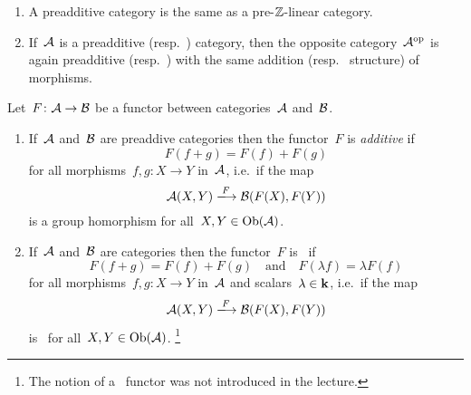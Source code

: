 \begin{remark*}
  \leavevmode
  \begin{enumerate}
    \item
      A preadditive category is the same as a pre\nobreakdash-$\mathbb{Z}$\nobreakdash-linear category.
    \item
      If~$\mathcal{A}$ is a preadditive (resp.\ {\preklin}) category, then the opposite category~$\mathcal{A}^{\mathrm{op}}$ is again preadditive (resp.\ {\preklin}) with the same addition (resp.~{\module{$\kf$}} structure) of morphisms.
  \end{enumerate}
\end{remark*}


\begin{definition}
  Let~$F \colon \mathcal{A} \to \mathcal{B}$ be a functor between categories~$\mathcal{A}$ and~$\mathcal{B}$.
  \begin{enumerate}
    \item
      If~$\mathcal{A}$ and~$\mathcal{B}$ are preaddive categories then the functor~$F$ is \emph{additive} if
      \[
          F(f + g)
        = F(f) + F(g)
      \]
      for all morphisms~$f, g \colon X \to Y$ in~$\mathcal{A}$, i.e.\ if the map
      \[
                    \Acat(X, Y)
        \xlongto{F} \Bcat(F(X), F(Y))
      \]
      is a group homorphism for all~$X, Y \in \operatorname{Ob}(\mathcal{A})$.
    \item
      If~$\mathcal{A}$ and~$\mathcal{B}$ are {\preklin} categories then the functor~$F$ is~\emph{{\klin}} if
      \[
        F(f + g) = F(f) + F(g)
        \quad\text{and}\quad
        F(\lambda f) = \lambda F(f)
      \]
      for all morphisms~$f, g \colon X \to Y$ in~$\mathcal{A}$ and scalars~$\lambda \in \mathbf{k}$, i.e.\ if the map
      \[
                    \Acat(X, Y)
        \xlongto{F} \Bcat(F(X), F(Y))
      \]
      is~{\klin} for all~$X, Y \in \operatorname{Ob}(\mathcal{A})$.%
      \footnote{The notion of a~{\klin} functor was not introduced in the lecture.}
  \end{enumerate}
\end{definition}


